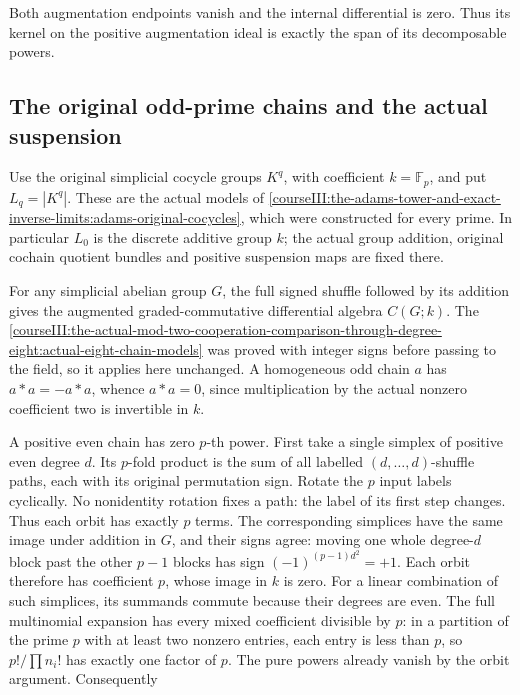 Both augmentation endpoints vanish and the internal differential is zero. Thus its kernel on the positive augmentation ideal is exactly the span of its decomposable powers.

\subsection{The original odd-prime chains and the actual suspension}
\label{courseIII:the-original-odd-prime-cooperations-and-degree-six-adams-calculation:odd-original-chains}

\label{courseIII:the-original-odd-prime-cooperations-and-degree-six-adams-calculation:section-2}\label{courseIII:odd-coop:2}

Use the original simplicial cocycle groups \(K^q\), with coefficient \(k=\mathbb F_p\), and put \(L_q=|K^q|\). These are the actual models of \cref{courseIII:the-adams-tower-and-exact-inverse-limits:adams-original-cocycles}, which were constructed for every prime. In particular \(L_0\) is the discrete additive group \(k\); the actual group addition, original cochain quotient bundles and positive suspension maps are fixed there.

For any simplicial abelian group \(G\), the full signed shuffle followed by its addition gives the augmented graded-commutative differential algebra \(C(G;k)\). The \cref{courseIII:the-actual-mod-two-cooperation-comparison-through-degree-eight:actual-eight-chain-models} was proved with integer signs before passing to the field, so it applies here unchanged. A homogeneous odd chain \(a\) has \(a\ast a=-a\ast a\), whence \(a\ast a=0\), since multiplication by the actual nonzero coefficient two is invertible in \(k\).

A positive even chain has zero \(p\)-th power. First take a single simplex of positive even degree \(d\). Its \(p\)-fold product is the sum of all labelled \((d,\ldots,d)\)-shuffle paths, each with its original permutation sign. Rotate the \(p\) input labels cyclically. No nonidentity rotation fixes a path: the label of its first step changes. Thus each orbit has exactly \(p\) terms. The corresponding simplices have the same image under addition in \(G\), and their signs agree: moving one whole degree-\(d\) block past the other \(p-1\) blocks has sign \((-1)^{(p-1)d^2}=+1\). Each orbit therefore has coefficient \(p\), whose image in \(k\) is zero. For a linear combination of such simplices, its summands commute because their degrees are even. The full multinomial expansion has every mixed coefficient divisible by \(p\): in a partition of the prime \(p\) with at least two nonzero entries, each entry is less than \(p\), so \(p!/\prod n_i!\) has exactly one factor of \(p\). The pure powers already vanish by the orbit argument. Consequently

